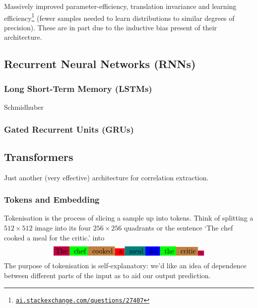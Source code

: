 \documentclass[11pt]{article}
\begin{document}
\begin{tcolorbox}[title={\centering\textbf{Why use a CNN over an MLP?}}, colback=myLightBlue, colbacktitle=myDarkBlue, colframe=myDarkBlue, coltitle=white]
    Massively improved parameter-efficiency, translation invariance and learning efficiency\footnote{\href{https://ai.stackexchange.com/questions/27407/what-does-statistical-efficiency-mean-in-this-context}{\texttt{ai.stackexchange.com/questions/27407}}} (fewer samples needed to learn distributions to similar degrees of precision). These are in part due to the inductive bias present of their architecture.
\end{tcolorbox}

\subsection{\TODO Recurrent Neural Networks (RNNs)}

\subsubsection{Long Short-Term Memory (LSTMs)}
Schmidhuber

\subsubsection{Gated Recurrent Units (GRUs)}

\subsection{\TODO Transformers}
Just another (very effective) architecture for correlation extraction.

\subsubsection{Tokens and Embedding}
Tokenisation is the process of slicing a sample up into tokens. Think of splitting a $512\times512$ image into its four $256\times256$ quadrants or the sentence `The chef cooked a meal for the critic.' into
$$
\colorbox{purple}{The}\colorbox{green}{ chef}\colorbox{brown}{ cooked}\colorbox{red}{ a}\colorbox{teal}{ meal}\colorbox{blue}{ for}\colorbox{green}{ the}\colorbox{brown}{ critic}\colorbox{purple}{.}
$$
The purpose of tokenisation is self-explanatory: we'd like an idea of dependence between different parts of the input as to aid our output prediction.
\end{document}
